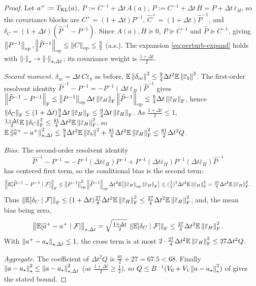 \begin{proof}
Let $a^+:=T_{\mathrm{KL}}(a)$, $P:=C^{-1}+\Delta t\,A(a)$, $\widehat P:=C^{-1}+\Delta t\,\overline H=P+\Delta t\,\overline\varepsilon_H$,
so the covariance blocks are $C^+=(1+\Delta t)P^{-1}$, $\widehat C^+=(1+\Delta t)\widehat P^{-1}$, and
$\delta_C=(1+\Delta t)(\widehat P^{-1}-P^{-1})$. Since $A(a),\overline H\succeq0$, $P\succeq C^{-1}$ and
$\widehat P\succeq C^{-1}$, giving $\left\lVert P^{-1}\right\rVert_{\mathrm{op}},\left\lVert \widehat P^{-1}\right\rVert_{\mathrm{op}}\leq\left\lVert C\right\rVert_{\mathrm{op}}\leq\tfrac32$
(a.s.). The expansion \eqref{eq:perturb-expand} holds with $\left\lVert \cdot\right\rVert_\star\to\left\lVert \cdot\right\rVert_{\star,\Delta t}$;
its covariance weight is $\tfrac{1+\Delta t}2$.

\emph{Second moment.} $\delta_m=\Delta t\,C\overline\varepsilon_b$ as before, $\mathbb{E}\left\lVert \delta_m\right\rVert^2\leq\tfrac94\Delta t^2\mathbb{E}\left\lVert \overline\varepsilon_b\right\rVert^2$.
The first-order resolvent identity $\widehat P^{-1}-P^{-1}=-P^{-1}(\Delta t\,\overline\varepsilon_H)\widehat P^{-1}$
gives $\left\lVert \widehat P^{-1}-P^{-1}\right\rVert_{\mathrm{F}}\leq\left\lVert P^{-1}\right\rVert_{\mathrm{op}}\Delta t\left\lVert \overline\varepsilon_H\right\rVert_{\mathrm{F}}\left\lVert \widehat P^{-1}\right\rVert_{\mathrm{op}}\leq\tfrac94\Delta t\left\lVert \overline\varepsilon_H\right\rVert_{\mathrm{F}}$,
hence $\left\lVert \delta_C\right\rVert_{\mathrm{F}}\leq(1+\Delta t)\tfrac94\Delta t\left\lVert \overline\varepsilon_H\right\rVert_{\mathrm{F}}\leq\tfrac92\Delta t\left\lVert \overline\varepsilon_H\right\rVert_{\mathrm{F}}$.
As $\tfrac{1+\Delta t}2\leq1$, $\tfrac{1+\Delta t}2\mathbb{E}\left\lVert \delta_C\right\rVert_{\mathrm{F}}^2\leq\tfrac{81}4\Delta t^2\mathbb{E}\left\lVert \overline\varepsilon_H\right\rVert_{\mathrm{F}}^2$,
so $\mathbb{E}\left\lVert \widehat a^+-a^+\right\rVert_{\star,\Delta t}^2\leq\tfrac94\Delta t^2\mathbb{E}\left\lVert \overline\varepsilon_b\right\rVert^2+\tfrac{81}4\Delta t^2\mathbb{E}\left\lVert \overline\varepsilon_H\right\rVert_{\mathrm{F}}^2\leq\tfrac{81}2\Delta t^2Q$.

\emph{Bias.} The second-order resolvent identity
\[
    \widehat P^{-1}-P^{-1}=-P^{-1}(\Delta t\overline\varepsilon_H)P^{-1}+P^{-1}(\Delta t\overline\varepsilon_H)P^{-1}(\Delta t\overline\varepsilon_H)\widehat P^{-1}
\]
has centered first term, so the conditional bias is the second term:
\[
    \left\lVert \mathbb{E}[\widehat P^{-1}-P^{-1}\mid\mathcal{F}]\right\rVert_{\mathrm{F}}
    \leq\left\lVert P^{-1}\right\rVert_{\mathrm{op}}^2\left\lVert \widehat P^{-1}\right\rVert_{\mathrm{op}}\Delta t^2\mathbb{E}\bigl[\left\lVert \overline\varepsilon_H\right\rVert_{\mathrm{op}}\left\lVert \overline\varepsilon_H\right\rVert_{\mathrm{F}}\bigr]
    \leq(\tfrac32)^3\Delta t^2\mathbb{E}\left\lVert \overline\varepsilon_H\right\rVert_{\mathrm{F}}^2
    =\tfrac{27}8\Delta t^2\mathbb{E}\left\lVert \overline\varepsilon_H\right\rVert_{\mathrm{F}}^2 .
\]
Thus $\left\lVert \mathbb{E}[\delta_C\mid\mathcal{F}]\right\rVert_{\mathrm{F}}\leq(1+\Delta t)\tfrac{27}8\Delta t^2\mathbb{E}\left\lVert \overline\varepsilon_H\right\rVert_{\mathrm{F}}^2\leq\tfrac{27}4\Delta t^2\mathbb{E}\left\lVert \overline\varepsilon_H\right\rVert_{\mathrm{F}}^2$,
and, the mean bias being zero,
\[
    \left\lVert \mathbb{E}[\widehat a^+-a^+\mid\mathcal{F}]\right\rVert_{\star,\Delta t}=\sqrt{\tfrac{1+\Delta t}2}\,\left\lVert \mathbb{E}[\delta_C\mid\mathcal{F}]\right\rVert_{\mathrm{F}}\leq\tfrac{27}4\Delta t^2\mathbb{E}\left\lVert \overline\varepsilon_H\right\rVert_{\mathrm{F}}^2 .
\]
With $\left\lVert a^+-a_\star\right\rVert_{\star,\Delta t}\leq1$, the cross term is at most
$2\cdot\tfrac{27}4\Delta t^2\mathbb{E}\left\lVert \overline\varepsilon_H\right\rVert_{\mathrm{F}}^2\leq27\Delta t^2Q$.

\emph{Aggregate.} The coefficient of $\Delta t^2Q$ is $\tfrac{81}2+27=67.5<68$. Finally
$\left\lVert a-a_\star\right\rVert_\star^2\leq\left\lVert a-a_\star\right\rVert_{\star,\Delta t}^2$ (as $\tfrac{1+\Delta t}2\geq\tfrac12$), so
$Q\leq B^{-1}(V_0+V_1\left\lVert a-a_\star\right\rVert_\star^2)$ of  gives the stated bound.
\end{proof}

